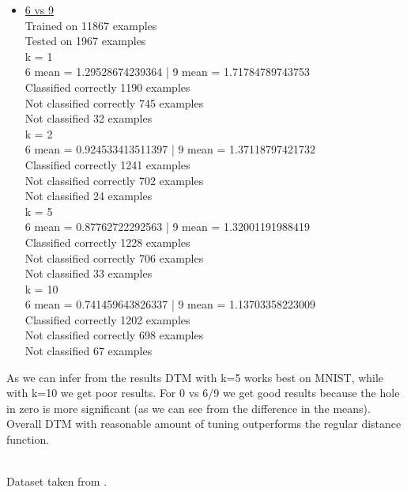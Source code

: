 \documentclass[11pt]{article}
\theoremstyle{definition}
\theoremstyle{definition}
\begin{document}
\begin{itemize}
	\item
		\underline{6 vs 9}\\
Trained on 11867 examples\\
Tested on  1967 examples\\
k = 1\\
6 mean = 1.29528674239364 | 9 mean = 1.71784789743753\\
Classified correctly 1190 examples\\
Not classified correctly 745 examples\\
Not classified 32 examples\\
k = 2\\
6 mean = 0.924533413511397 | 9 mean = 1.37118797421732\\
Classified correctly 1241 examples\\
Not classified correctly 702 examples\\
Not classified 24 examples\\
k = 5\\
6 mean = 0.87762722292563 | 9 mean = 1.32001191988419\\
Classified correctly 1228 examples\\
Not classified correctly 706 examples\\
Not classified 33 examples\\
k = 10\\
6 mean = 0.741459643826337 | 9 mean = 1.13703358223009\\
Classified correctly 1202 examples\\
Not classified correctly 698 examples\\
Not classified 67 examples
\end{itemize}

As we can infer from the results DTM with k=5 works best on MNIST, while with k=10 we get poor results.
For 0 vs 6/9 we get good results because the hole in zero is more significant (as we can see from the difference in the means).\\
Overall DTM with reasonable amount of tuning outperforms the regular distance function.

\text{}\\
Dataset taken from \cite{mnist}.
\end{document}
